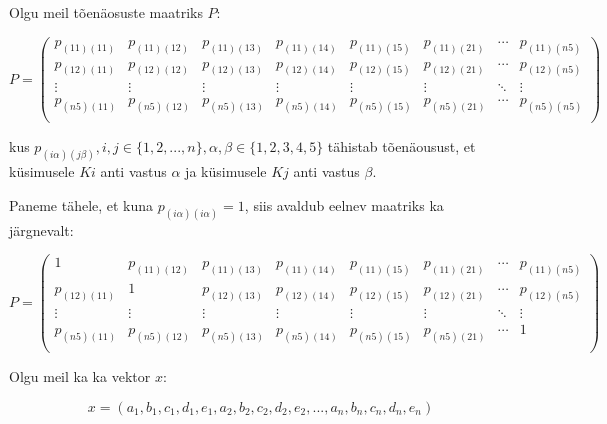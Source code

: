 \documentclass{article}
\newenvironment{tightcenter}{%
  \setlength\topsep{0pt}
  \setlength\parskip{0pt}
  \begin{center}
}{%
  \end{center}
}
\begin{document}
Olgu meil tõenäosuste maatriks $P$:
\begin{tightcenter}
\begin{equation*}
P =
\begin{pmatrix}
p_{(11)(11)}&p_{(11)(12)}&p_{(11)(13)}&p_{(11)(14)}&p_{(11)(15)}&p_{(11)(21)}&\cdots&p_{(11)(n5)} \\
p_{(12)(11)}&p_{(12)(12)}&p_{(12)(13)}&p_{(12)(14)}&p_{(12)(15)}&p_{(12)(21)}&\cdots&p_{(12)(n5)} \\
\vdots&\vdots&\vdots&\vdots&\vdots&\vdots&\ddots&\vdots \\
p_{(n5)(11)}&p_{(n5)(12)}&p_{(n5)(13)}&p_{(n5)(14)}&p_{(n5)(15)}&p_{(n5)(21)}&\cdots&p_{(n5)(n5)} \\
\end{pmatrix} 
\end{equation*}
\end{tightcenter}

kus  $p_{(i \alpha) (j \beta)}, i,j \in \{1,2,...,n\}, \alpha , \beta \in \{1,2,3,4,5\}$ tähistab tõenäousust, et k\"usimusele $Ki$ anti vastus $\alpha$ ja k\"usimusele $Kj$ anti vastus $\beta$. 

Paneme tähele, et kuna $p_{(i \alpha)( i \alpha)} = 1$, siis avaldub eelnev maatriks ka järgnevalt:

\begin{tightcenter}
\begin{equation*}
P =
\begin{pmatrix}
1&p_{(11)(12)}&p_{(11)(13)}&p_{(11)(14)}&p_{(11)(15)}&p_{(11)(21)}&\cdots&p_{(11)(n5)} \\
p_{(12)(11)}&1&p_{(12)(13)}&p_{(12)(14)}&p_{(12)(15)}&p_{(12)(21)}&\cdots&p_{(12)(n5)} \\
\vdots&\vdots&\vdots&\vdots&\vdots&\vdots&\ddots&\vdots \\
p_{(n5)(11)}&p_{(n5)(12)}&p_{(n5)(13)}&p_{(n5)(14)}&p_{(n5)(15)}&p_{(n5)(21)}&\cdots&1\\
\end{pmatrix} 
\end{equation*}
\end{tightcenter}


Olgu meil ka ka vektor $x$:

\begin{tightcenter}
\begin{equation*}
x = (a_1,b_1,c_1,d_1,e_1,a_2,b_2,c_2,d_2,e_2,...,a_n,b_n,c_n,d_n,e_n)
\end{equation*}
\end{tightcenter}
\end{document}
